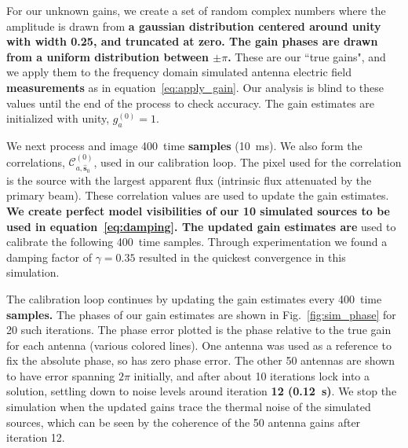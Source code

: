 \documentclass[a4paper,fleqn,usenatbib]{../mnras}
\newcommand{\spix}{\ensuremath{\hat{\mathbf{s}}_{0}}}
\newcommand{\Cna}[1][n]{\ensuremath{\mathcal{C}^{(#1)}_{a,\spix}}}
\newcommand{\caliter}{400}
\newcommand{\damp}{\ensuremath{\gamma}}
\begin{document}
For our unknown gains, we create a set of random complex numbers where the amplitude is 
drawn from \textbf{a gaussian distribution centered around unity with width 0.25, and truncated at zero. The gain phases are drawn from a uniform distribution between $\pm \pi$. }
These are our ``true gains", and we apply them to the frequency
domain simulated antenna electric field \textbf{measurements} as in equation~\ref{eq:apply_gain}. Our analysis is 
blind to these values until the end of the process to check accuracy. The gain estimates are 
initialized with unity, $g^{(0)}_a=1$.

We next process and image \caliter~time \textbf{samples} (10~ms). We also form the correlations, 
\Cna[0], used in our calibration loop. The pixel used for the correlation is the source with the 
largest apparent flux (intrinsic flux attenuated by the primary beam). These correlation values 
are used to update the gain estimates. \textbf{We create perfect model 
visibilities of our 10 simulated sources to be used in equation~\ref{eq:damping}. 
The updated gain estimates are} used to calibrate the following 
\caliter~time samples. Through experimentation we found a damping factor of $\damp=0.35$ 
resulted in the quickest convergence in this simulation.

The calibration loop continues by updating the gain estimates every \caliter~time \textbf{samples.} The 
phases of our gain estimates are shown in Fig.~\ref{fig:sim_phase} for 20 such iterations. 
The phase error plotted is the phase relative to the true gain for each antenna (various colored 
lines). One antenna was used as a reference to fix the absolute phase, so has zero phase 
error. The other 50 antennas are shown to have error spanning $2\pi$ initially, and after about 
10 iterations lock into a solution, settling down to noise levels around iteration \textbf{12 (0.12~s)}. We 
stop the simulation when the updated gains trace the thermal noise of the simulated sources, 
which can be seen by the coherence of the 50 antenna gains after iteration 12.
\end{document}

